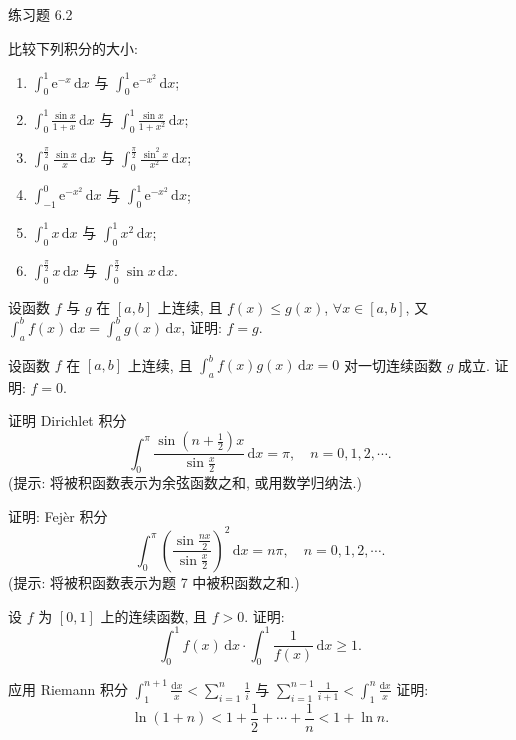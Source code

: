 \begin{exblock}{练习题 6.2}
  \item 比较下列积分的大小:
  \begin{enumerate}[label=(\arabic*)]
    \item $\int_{0}^{1}\mathrm{e}^{-x}\,\mathrm{d}x$ 与 $\int_{0}^{1}\mathrm{e}^{-x^{2}}\,\mathrm{d}x$;
    \item $\int_{0}^{1}\frac{\sin x}{1+x}\,\mathrm{d}x$ 与 $\int_{0}^{1}\frac{\sin x}{1+x^{2}}\,\mathrm{d}x$;
    \item $\int_{0}^{\frac{\pi}{2}}\frac{\sin x}{x}\,\mathrm{d}x$ 与 $\int_{0}^{\frac{\pi}{2}}\frac{\sin^{2}x}{x^{2}}\,\mathrm{d}x$;
    \item $\int_{-1}^{0}\mathrm{e}^{-x^{2}}\,\mathrm{d}x$ 与 $\int_{0}^{1}\mathrm{e}^{-x^{2}}\,\mathrm{d}x$;
    \item $\int_{0}^{1}x\,\mathrm{d}x$ 与 $\int_{0}^{1}x^{2}\,\mathrm{d}x$;
    \item $\int_{0}^{\frac{\pi}{2}}x\,\mathrm{d}x$ 与 $\int_{0}^{\frac{\pi}{2}}\sin x\,\mathrm{d}x$.
  \end{enumerate}

  \item 设函数 $f$ 与 $g$ 在 $[a,b]$ 上连续, 且 $f(x)\leqslant g(x)$, $\forall x\in[a,b]$, 又 $\int_{a}^{b}f(x)\,\mathrm{d}x=\int_{a}^{b}g(x)\,\mathrm{d}x$, 证明: $f=g$.

  \item 设函数 $f$ 在 $[a,b]$ 上连续, 且 $\int_{a}^{b}f(x)g(x)\,\mathrm{d}x=0$ 对一切连续函数 $g$ 成立. 证明: $f=0$.

  \item 证明 Dirichlet 积分
  \[
  \int_{0}^{\pi}\frac{\sin\left(n+\frac{1}{2}\right)x}{\sin\frac{x}{2}}\,\mathrm{d}x=\pi,\quad n=0,1,2,\cdots.
\]
  (提示: 将被积函数表示为余弦函数之和, 或用数学归纳法.)

  \item 证明: Fejèr 积分
  \[
  \int_{0}^{\pi}\left(\frac{\sin\frac{nx}{2}}{\sin\frac{x}{2}}\right)^{2}\,\mathrm{d}x=n\pi,\quad n=0,1,2,\cdots.
\]
  (提示: 将被积函数表示为题 7 中被积函数之和.)

  \item 设 $f$ 为 $[0,1]$ 上的连续函数, 且 $f>0$. 证明:
  \[
  \int_{0}^{1}f(x)\,\mathrm{d}x\cdot\int_{0}^{1}\frac{1}{f(x)}\,\mathrm{d}x\geqslant 1.
\]

  \item 应用 Riemann 积分 $\int_{1}^{n+1}\frac{\mathrm{d}x}{x}<\sum\limits_{i=1}^{n}\frac{1}{i}$ 与 $\sum\limits_{i=1}^{n-1}\frac{1}{i+1}<\int_{1}^{n}\frac{\mathrm{d}x}{x}$ 证明:
  \[
  \ln(1+n)<1+\frac{1}{2}+\cdots+\frac{1}{n}<1+\ln n.
\]
\end{exblock}

